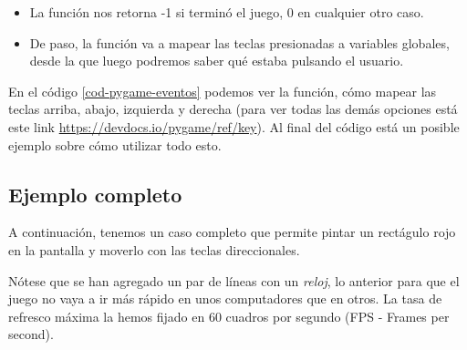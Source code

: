 \begin{itemize}
\item La función nos retorna -1 si terminó el juego, 0 en cualquier otro caso.
\item De paso, la función va a mapear las teclas presionadas a variables globales, desde la que luego podremos saber qué estaba pulsando el usuario.
\end{itemize} 

En el código \ref{cod-pygame-eventos} podemos ver la función, cómo mapear las teclas arriba, abajo, izquierda y derecha (para ver todas las demás opciones está este link \url{https://devdocs.io/pygame/ref/key}). Al final del código está un posible ejemplo sobre cómo utilizar todo esto.



\subsection{Ejemplo completo}

A continuación, tenemos un caso completo que permite pintar un rectágulo rojo en la pantalla y moverlo con las teclas direccionales. 

Nótese que se han agregado un par de líneas con un \emph{reloj}, lo anterior para que el juego no vaya a ir más rápido en unos computadores que en otros. La tasa de refresco máxima la hemos fijado en 60 cuadros por segundo (FPS - Frames per second).



